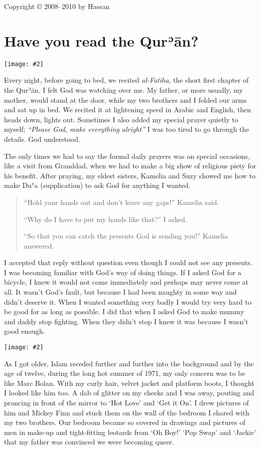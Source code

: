 \documentclass[12pt]{memoir}
\def\´{ʾ} %
\def\`{ʿ} %
\def \Quran{Qur\-\´ān} %
\def\–{-\hskip0pt}
\newcommand{\img}[3]{\begin{center}%
\texttt{[image: \#2]}\\{\small\em#3}%
\end{center}}
\begin{document}
\hfill Copyright © 2008–2010 by Hassan

\mainmatter


\chapter{Have you read the \Quran?}

\img{scale=0.7}{Baby_Hassan.jpg}{}

Every night, before going to bed, we recited \emph{al\–Fatiha},
the short first chapter of the \Quran.
I felt God was watching over me.
My father, or more usually, my mother, would stand at the door,
while my two brothers and I folded our arms and sat up in bed.
We recited it at lightening speed in Arabic and English,
then heads down, lights out.
Sometimes I also added my special prayer quietly to myself;
\emph{“Please God, make everything alright”}
I was too tired to go through the details.
God understood.

The only times we had to say the formal daily prayers was on special occasions,
like a visit from Granddad,
when we had to make a big show of religious piety for his benefit.
After praying, my eldest sisters, Kamelia and Suzy showed me
how to make Du\`a (supplication) to ask God for anything I wanted.

\begin{quote}
“Hold your hands out and don’t leave any gaps!” Kamelia said.

“Why do I have to put my hands like that?” I asked.

“So that you can catch the presents God is sending you!” Kamelia answered.
\end{quote}

I accepted that reply without question
even though I could not see any presents.
I was becoming familiar with God’s way of doing things.
If I asked God for a bicycle, I knew it would not come immediately
and perhaps may never come at all.
It wasn’t God’s fault, but because I had been naughty in some way
and didn’t deserve it.
When I wanted something very badly I would try very hard
to be good for as long as possible.
I did that when I asked God to make mummy and daddy stop fighting.
When they didn’t stop I knew it was because I wasn’t good enough.

\img{scale=1}{Hassan_Boy.jpg}{}

As I got older, Islam receded further and further into the background
and by the age of twelve, during the long hot summer of 1971,
my only concern was to be like Marc Bolan.
With my curly hair, velvet jacket and platform boots,
I thought I looked like him too.
A dab of glitter on my cheeks and I was away,
pouting and prancing in front of the mirror to ‘Hot Love’ and ‘Get it On’.
I drew pictures of him and Mickey Finn
and stuck them on the wall of the bedroom I shared with my two brothers.
Our bedroom became so covered in drawings and pictures of men in make-up
and tight-fitting leotards from ‘Oh Boy!’ ‘Pop Swap’ and ‘Jackie’
that my father was convinced we were becoming queer.
\end{document}
